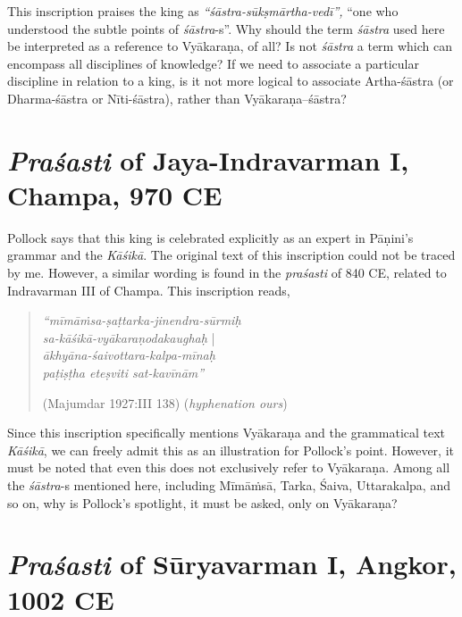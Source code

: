 This inscription praises the king as {\sl ``śāstra-sūkṣmārtha-vedī'',} ``one who understood the subtle points of {\sl śāstra}-s''. Why should the term {\sl śāstra} used here be interpreted as a reference to Vyākaraṇa, of all? Is not {\sl śāstra} a term which can encompass all disciplines of knowledge? If we need to associate a particular discipline in relation to a king, is it not more logical to associate Artha-śāstra (or Dharma-śāstra or Nīti-śāstra), rather than Vyākaraṇa--śāstra?

\section{{\sl\bfseries Praśasti} of Jaya-Indravarman I, Champa, 970 CE}\label{chap3-sec5}

Pollock says that this king is celebrated explicitly as an expert in Pāṇini's grammar and the {\sl Kāśikā}.  The original text of this inscription could not be traced by me. However, a similar wording is found in the {\sl praśasti} of 840 CE, related to Indravarman III of Champa. This inscription reads, 
\begin{quote}
{{\sl ``mīmāṁsa-ṣaṭtarka-jinendra-sūrmiḥ}}\\
\phantom{\quad} {{\sl sa-kāśikā-vyākaraṇodakaughaḥ}} |\\
{{\sl ākhyāna-śaivottara-kalpa-mīnaḥ}}\\
\phantom{\quad} {{\sl paṭiṣṭha eteṣviti sat-kavīnām''}}

\hfill (Majumdar 1927:III 138) ({\sl hyphenation ours})
\end{quote}

Since this inscription specifically mentions Vyākaraṇa and the grammatical text {\sl Kāśikā},  we can freely admit this as an illustration for Pollock's point. However, it must be noted that even this does not exclusively refer to Vyākaraṇa. Among all the {\sl śāstra}-s mentioned here, including Mīmāṁsā, Tarka, Śaiva, Uttarakalpa, and so on, why is Pollock's spotlight, it must be asked, only on Vyākaraṇa?

\section{{\sl\bfseries Praśasti} of Sūryavarman I, Angkor, 1002 CE}\label{chap3-sec6}

